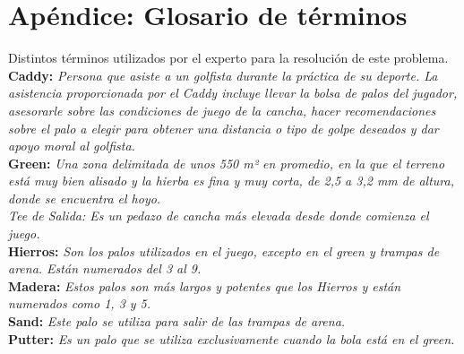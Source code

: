\documentclass[runningheads,a4paper]{llncs}
\begin{document}
\appendix

\section{Apéndice: Glosario de términos}

  Distintos términos utilizados por el experto para la resolución de este
  problema.\\

  \textbf{Caddy:} \textit{Persona que asiste a un golfista durante la práctica de
  su deporte. La asistencia proporcionada por el Caddy incluye llevar la bolsa de
  palos del jugador, asesorarle sobre las condiciones de juego de la cancha,
  hacer recomendaciones sobre el palo a elegir para obtener una distancia o tipo
  de golpe deseados y dar apoyo moral al golfista.}\\
  
  \textbf{Green:}  \textit{Una zona delimitada de unos 550 m² en promedio, en la
    que el terreno está muy bien alisado y la hierba es fina y muy corta, de 2,5
    a 3,2 mm de altura, donde se encuentra el hoyo.\\ 
  Tee de Salida: Es un pedazo de cancha más elevada desde donde comienza el
  juego.}\\
  
  \textbf{Hierros:} \textit{Son los palos utilizados en el juego, excepto en el
  green y trampas de arena. Están numerados del 3 al 9.}\\
  
  \textbf{Madera:} \textit{Estos palos son más largos y potentes que los Hierros
  y están numerados como 1, 3 y 5.}\\
  
  \textbf{Sand:} \textit{Este palo se utiliza para salir de las trampas de
  arena.}\\
  
  \textbf{Putter:} \textit{Es un palo que se utiliza exclusivamente cuando la
  bola está en el green.}
\end{document}
